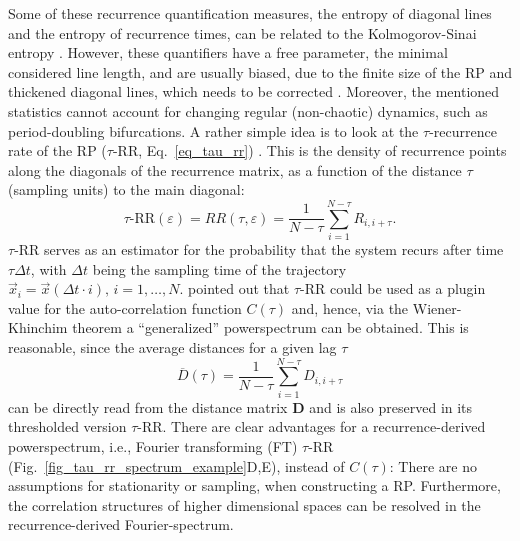\documentclass[entropy,article,submit,pdftex,moreauthors]{Definitions/mdpi}
\begin{document}
Some of these recurrence quantification measures, the entropy of diagonal lines and the entropy of 
recurrence times, can be related to the Kolmogorov-Sinai entropy \cite{march2005,baptista2010}. However, these quantifiers have a free parameter, the minimal considered line length, and 
are usually biased, due to the finite size of the RP and thickened diagonal lines, which needs to be corrected \cite{Kraemer2019}. Moreover, the mentioned statistics cannot account for 
changing regular (non-chaotic) dynamics, such as period-doubling bifurcations.
A rather simple idea is to look at the $\tau$-recurrence rate of the RP ($\tau$-RR, Eq.~\ref{eq_tau_rr}) \cite{marwan2002pla,Zbilut2008}.
This is the density of recurrence points along the diagonals of the recurrence matrix, as a function of the distance $\tau$ (sampling units) to the main diagonal:
\begin{equation}\label{eq_tau_rr}
\tau\text{-RR}(\varepsilon) = RR(\tau, \varepsilon) = \frac{1}{N-\tau} \sum_{i=1}^{N-\tau	} R_{i,i+\tau}.
\end{equation}
$\tau$-RR serves as an estimator for the probability that the system recurs after time $\tau \Delta t$, with $\Delta t$ being the sampling time of the trajectory 
$\vec{x}_i = \vec{x}(\Delta t \cdot i),\, i=1,\ldots,N$. 
\citet{Zbilut2008} pointed out that $\tau$-RR could be used as a plugin value for the auto-correlation function $C(\tau)$ and, hence, via the Wiener-Khinchim theorem a 
``generalized'' powerspectrum can be obtained. This is reasonable, since the average distances for a given lag $\tau$ 
\begin{equation}
\overline{D}(\tau) = \frac{1}{N-\tau}\sum_{i=1}^{N-\tau} D_{i, i+\tau}
\end{equation}
can be directly read from the distance matrix $\mathbf{D}$ and is also preserved in its thresholded version $\tau$-RR. There are clear advantages for a recurrence-derived 
powerspectrum, i.e., Fourier transforming (FT) $\tau$-RR (Fig.~\ref{fig_tau_rr_spectrum_example}D,E), instead 
of $C(\tau)$: There are no assumptions for stationarity or sampling, when constructing a RP.
Furthermore, the correlation structures of higher dimensional spaces can be resolved in the recurrence-derived Fourier-spectrum.\\
\end{document}
